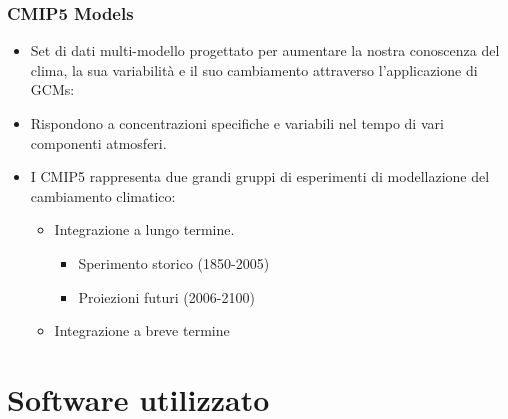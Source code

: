 \documentclass[14pt,usenames,dvipsnames]{beamer}
\begin{document}
\begin{frame}
	\frametitle{CMIP5 Models}
{\fontsize{13pt}{14}\selectfont	
	\begin{itemize}
	\setlength\itemsep{10pt}
	 \item<2-> Set di dati multi-modello progettato per aumentare la nostra conoscenza del clima, la sua variabilità e il suo cambiamento attraverso l'applicazione di GCMs:
	  \item<3-> Rispondono a concentrazioni specifiche e variabili nel tempo di vari componenti atmosferi.
	 \item<4-> I CMIP5 rappresenta due grandi gruppi di esperimenti di modellazione del cambiamento climatico:
	   \begin{itemize}
	      \item<5-> {\fontsize{12pt}{14}\selectfont Integrazione a lungo termine.}
	       \begin{itemize}
	       \item Sperimento storico (1850-2005)
	       \item Proiezioni futuri (2006-2100)
	       \end{itemize}
	      \item<6-> {\fontsize{12pt}{14}\selectfont Integrazione a breve termine}
	   \end{itemize}
		  
	 
	\end{itemize}
	
}	
\end{frame}


\section{Software utilizzato}
\end{document}
